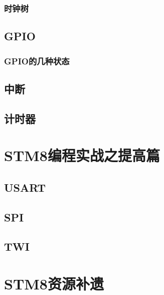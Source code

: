 \documentclass[a4paper]{book}
\newcommand{\prechap}{第}
\newcommand{\postchap}{章}
\newcommand{\chap}[1]{\newpage\thispagestyle{empty}\chapter{#1}\label{chap:\thechapter}}
\renewcommand{\appendixname}{}
\begin{document}
\subsection{时钟树}

\section{GPIO}

\subsection{GPIO的几种状态}

\section{中断}

\section{计时器}

\chap{STM8编程实战之提高篇}

\section{USART}

\section{SPI}

\section{TWI}

\chap{STM8资源补遗}



\appendices
\renewcommand{\prechap}{\appendixname}
\renewcommand{\postchap}{}
\end{document}
